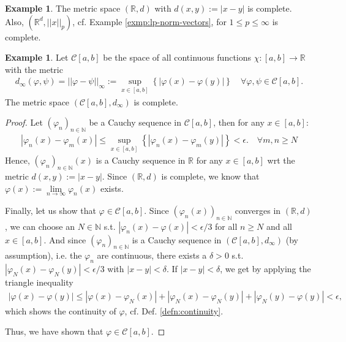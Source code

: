 \documentclass[12pt, a4paper]{article}
\numberwithin{equation}{section}
\theoremstyle{definition}
\theoremstyle{definition}
\newtheorem{exmp}[thm]{Example} %
\newcommand{\norm}[2]{\left\vert\left\vert #1 \right\vert\right\vert_{#2}}
\newcommand{\abs}[1]{\left\vert #1 \right\vert}
\begin{document}
	\begin{exmp}
		The metric space $(\mathbb R, d)$ with $d(x, y) := \abs{x - y}$ is \mbox{complete}. Also, $(\mathbb R^{d}, \norm{x}{p})$, cf. Example \ref{exmp:lp-norm-vectors}, for $1\leq p\leq \infty$ is complete.
	\end{exmp}

	\begin{exmp}\label{exmp:space-continuous-functions-complete}
		Let $\mathcal C[a, b]$ be the space of all continuous functions $\chi: [a, b]\to\mathbb{R}$ with the metric 
		\begin{align}
			d_{\infty}(\varphi, \psi) = \norm{\varphi - \psi}{\infty} :=  \sup_{x\in [a, b]}\left\{ \abs{\varphi(x) - \varphi(y)} \right\}\quad \forall \varphi, \psi\in\mathcal C[a, b].
		\end{align}
		The metric space $(\mathcal C[a, b], d_{\infty})$ is complete.
	\end{exmp}

	\begin{proof}
		Let $(\varphi_n)_{n\in\mathbb N}$ be a Cauchy sequence in $\mathcal C[a, b]$, then for any $x\in [a, b]$:
		\begin{align}
			\abs{\varphi_n(x) - \varphi_m(x)} \leq \sup_{x\in [a, b]}\left\{ \abs{\varphi_{n}(x) - \varphi_{m}(y)} \right\} < \epsilon. \quad\forall m, n\geq N
		\end{align} 
		Hence, $(\varphi_n)_{n\in\mathbb N}(x)$ is a Cauchy sequence in $\mathbb R$ for any $x\in[a, b]$ wrt the metric $d(x, y) := \abs{x - y}$. Since $\left(\mathbb R, d\right)$ is complete, we know that $\varphi(x) := \lim\limits_{n\to\infty}\varphi_n(x)$ exists. 
		
		Finally, let us show that $\varphi\in\mathcal C[a, b]$. Since $\left(\varphi_n(x)\right)_{n\in\mathbb N}$ converges in $(\mathbb R, d)$, we can choose an $N\in\mathbb N$ s.t. $\abs{\varphi_n(x) - \varphi(x)} < \epsilon/3$ for all $n\geq N$ and all $x\in[a, b]$. And since $\left(\varphi_n\right)_{n\in\mathbb N}$ is a Cauchy sequence in $(\mathcal C[a, b], d_{\infty})$ (by assumption), i.e. the $\varphi_n$ are continuous, there exists a $\delta > 0$ s.t. $\abs{\varphi_N(x) - \varphi_{N}(y)} < \epsilon/3$ with $\abs{x - y} < \delta$. If $\abs{x-y} < \delta$, we get by applying the triangle inequality
		\begin{align}
			\abs{\varphi(x) - \varphi(y)} \leq \abs{\varphi(x) - \varphi_N(x)} + \abs{\varphi_N(x) - \varphi_N(y)} + \abs{\varphi_N(y) - \varphi(y)} < \epsilon,
		\end{align}
		which shows the continuity of $\varphi$, cf. Def. \ref{defn:continuity}.
		
		Thus, we have shown that $\varphi\in\mathcal C[a, b]$.
	\end{proof}
\end{document}
